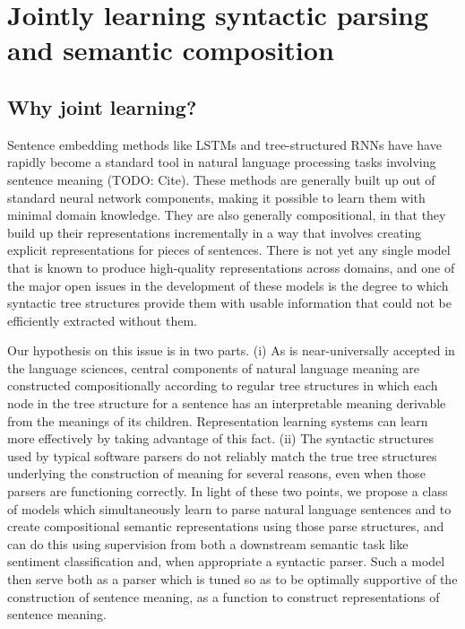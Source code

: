\section{Jointly learning syntactic parsing and semantic composition}


\subsection{Why joint learning?}

Sentence embedding methods like LSTMs and tree-structured RNNs have have rapidly become a standard tool in natural language processing tasks involving sentence meaning (TODO: Cite). These methods are generally built up out of standard neural network components, making it possible to learn them with minimal domain knowledge. They are also generally compositional, in that they build up their representations incrementally in a way that involves creating explicit representations for pieces of sentences. There is not yet any single model that is known to produce high-quality representations across domains, and one of the major open issues in the development of these models is the degree to which syntactic tree structures provide them with usable information that could not be efficiently extracted without them.

Our hypothesis on this issue is in two parts. (i) As is near-universally accepted in the language sciences, central components of natural language meaning are constructed compositionally according to regular tree structures in which each node in the tree structure for a sentence has an interpretable meaning derivable from the meanings of its children. Representation learning systems can learn more effectively by taking advantage of this fact. (ii) The syntactic structures used by typical software parsers do not reliably match the true tree structures underlying the construction of meaning for several reasons, even when those parsers are functioning correctly. In light of these two points, we propose a class of models which simultaneously learn to parse natural language sentences and to create compositional semantic representations using those parse structures, and can do this using supervision from both a downstream semantic task like sentiment classification and, when appropriate a syntactic parser. Such a model then serve both as a parser which is tuned so as to be optimally supportive of the construction of sentence meaning, as a function to construct representations of sentence meaning.


